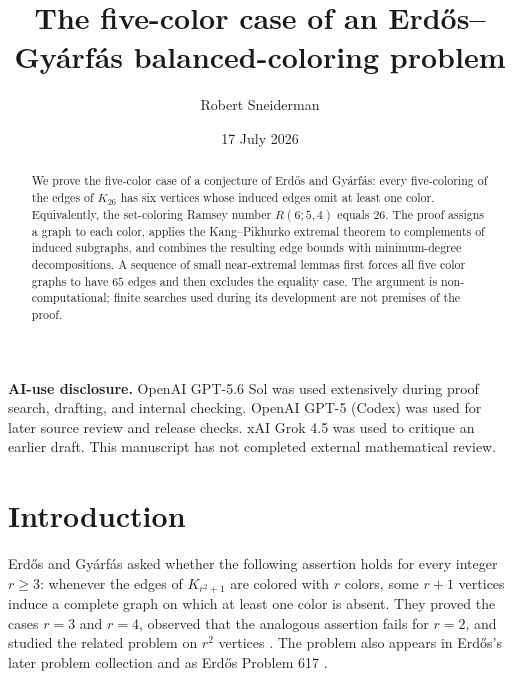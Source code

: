 \documentclass[11pt,reqno,a4paper]{amsart}
\title[The five-color case]{The five-color case of an Erd\H{o}s--Gy\'arf\'as balanced-coloring problem}
\author{Robert Sneiderman}
\date{17 July 2026}
\theoremstyle{definition}
\theoremstyle{remark}
\begin{document}

\begin{abstract}
We prove the five-color case of a conjecture of Erd\H{o}s and Gy\'arf\'as: every
five-coloring of the edges of $K_{26}$ has six vertices whose induced edges omit
at least one color.  Equivalently, the set-coloring Ramsey number
$R(6;5,4)$ equals $26$.  The proof assigns a graph to each color, applies the
Kang--Pikhurko extremal theorem to complements of induced subgraphs, and combines
the resulting edge bounds with minimum-degree decompositions.  A sequence of
small near-extremal lemmas first forces all five color graphs to have $65$ edges
and then excludes the equality case.  The argument is non-computational; finite
searches used during its development are not premises of the proof.
\end{abstract}

\maketitle

\begin{center}
\end{center}

\medskip
\noindent\textbf{AI-use disclosure.}
OpenAI GPT-5.6 Sol was used extensively during proof search, drafting, and
internal checking. OpenAI GPT-5 (Codex) was used for later source review and
release checks. xAI Grok 4.5 was used to critique an earlier draft. This
manuscript has not completed external mathematical review.
\medskip

\section{Introduction}

Erd\H{o}s and Gy\'arf\'as asked whether the following assertion holds for every
integer $r\geq 3$: whenever the edges of $K_{r^2+1}$ are colored with $r$
colors, some $r+1$ vertices induce a complete graph on which at least one color
is absent.  They proved the cases $r=3$ and $r=4$, observed that the analogous
assertion fails for $r=2$, and studied the related problem on $r^2$ vertices
\cite{ErdosGyarfas1999}.  The problem also appears in Erd\H{o}s's later problem
collection \cite{Erdos1999} and as Erd\H{o}s Problem 617
\cite{ErdosProblems617}.
\end{document}
